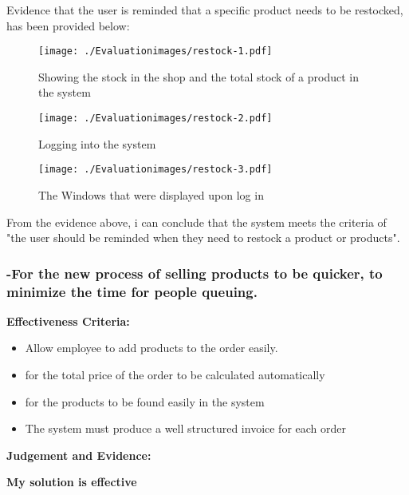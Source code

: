 Evidence that the user is reminded that a specific product needs to be restocked, has been provided below:

\begin{figure}[H]
\caption{Showing the stock in the shop and the total stock of a product in the system}
\hfill\texttt{[image: ./Evaluationimages/restock-1.pdf]}
\end{figure}

\begin{figure}[H]
\caption{Logging into the system}
\hfill\texttt{[image: ./Evaluationimages/restock-2.pdf]}
\end{figure}

\begin{figure}[H]
\caption{The Windows that were displayed upon log in}
\hfill\texttt{[image: ./Evaluationimages/restock-3.pdf]}
\end{figure}

From the evidence above, i can conclude that the system meets the criteria of "the user should be reminded when they need to restock a product or products".










\pagebreak
\subsubsection{-For the new process of selling products to be quicker, to minimize the time for people queuing.}

\textbf{Effectiveness Criteria:}\newline
\begin{itemize}
	\item{Allow employee to add products to the order easily.}
	\item{for the total price of the order to be calculated automatically}
	\item{for the products to be found easily in the system}
	\item{The system must produce a well structured invoice for each order}
\end{itemize}

\textbf{Judgement and Evidence:} \newline

\textbf{\large{My solution is effective}}

